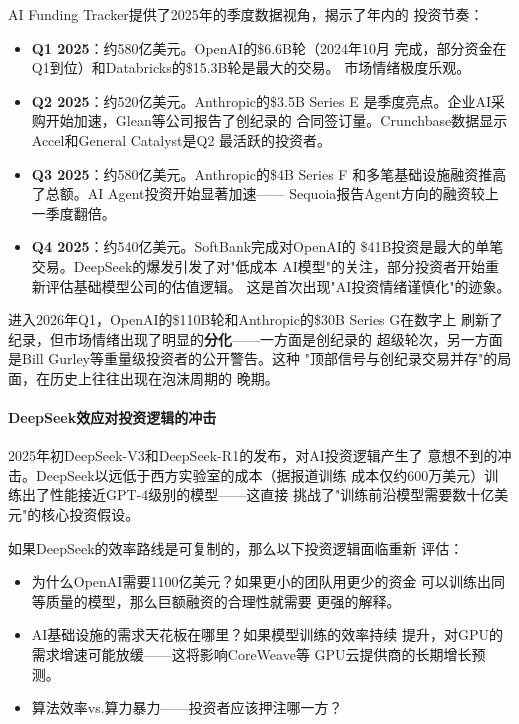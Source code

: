 AI Funding Tracker提供了2025年的季度数据视角，揭示了年内的
投资节奏：

\begin{itemize}
  \item \textbf{Q1 2025}：约580亿美元。OpenAI的\$6.6B轮（2024年10月
    完成，部分资金在Q1到位）和Databricks的\$15.3B轮是最大的交易。
    市场情绪极度乐观。
  \item \textbf{Q2 2025}：约520亿美元。Anthropic的\$3.5B Series E
    是季度亮点。企业AI采购开始加速，Glean等公司报告了创纪录的
    合同签订量。Crunchbase数据显示Accel和General Catalyst是Q2
    最活跃的投资者。
  \item \textbf{Q3 2025}：约580亿美元。Anthropic的\$4B Series F
    和多笔基础设施融资推高了总额。AI Agent投资开始显著加速——
    Sequoia报告Agent方向的融资较上一季度翻倍。
  \item \textbf{Q4 2025}：约540亿美元。SoftBank完成对OpenAI的
    \$41B投资是最大的单笔交易。DeepSeek的爆发引发了对"低成本
    AI模型"的关注，部分投资者开始重新评估基础模型公司的估值逻辑。
    这是首次出现"AI投资情绪谨慎化"的迹象。
\end{itemize}

进入2026年Q1，OpenAI的\$110B轮和Anthropic的\$30B Series G在数字上
刷新了纪录，但市场情绪出现了明显的\textbf{分化}——一方面是创纪录的
超级轮次，另一方面是Bill Gurley等重量级投资者的公开警告。这种
"顶部信号与创纪录交易并存"的局面，在历史上往往出现在泡沫周期的
晚期。

\paragraph{DeepSeek效应对投资逻辑的冲击}

2025年初DeepSeek-V3和DeepSeek-R1的发布，对AI投资逻辑产生了
意想不到的冲击。DeepSeek以远低于西方实验室的成本（据报道训练
成本仅约600万美元）训练出了性能接近GPT-4级别的模型——这直接
挑战了"训练前沿模型需要数十亿美元"的核心投资假设。

如果DeepSeek的效率路线是可复制的，那么以下投资逻辑面临重新
评估：
\begin{itemize}
  \item 为什么OpenAI需要1100亿美元？如果更小的团队用更少的资金
    可以训练出同等质量的模型，那么巨额融资的合理性就需要
    更强的解释。
  \item AI基础设施的需求天花板在哪里？如果模型训练的效率持续
    提升，对GPU的需求增速可能放缓——这将影响CoreWeave等
    GPU云提供商的长期增长预测。
  \item 算法效率vs.算力暴力——投资者应该押注哪一方？
\end{itemize}

